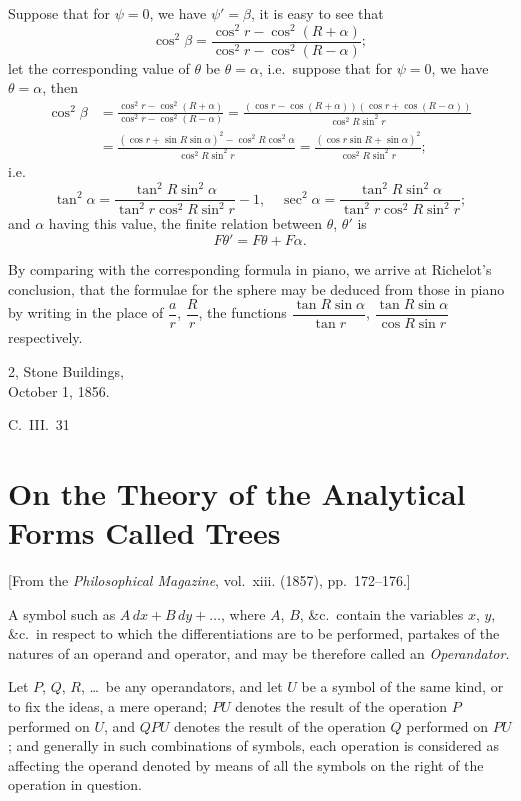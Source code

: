 \documentclass[11pt,a4paper]{book}
\begin{document}
Suppose that for $\psi = 0$, we have $\psi' = \beta$, it is easy to see that
\[
\cos^2\beta = \frac{\cos^2 r - \cos^2(R+\alpha)}{\cos^2 r - \cos^2(R-\alpha)};
\]
let the corresponding value of $\theta$ be $\theta = \alpha$, i.e.\ suppose that for $\psi = 0$, we have $\theta = \alpha$, then
\begin{align*}
\cos^2\beta &= \frac{\cos^2 r - \cos^2(R+\alpha)}{\cos^2 r - \cos^2(R-\alpha)} = \frac{(\cos r - \cos(R+\alpha))(\cos r + \cos(R-\alpha))}{\cos^2 R \sin^2 r} \\
&= \frac{(\cos r + \sin R \sin\alpha)^2 - \cos^2 R \cos^2\alpha}{\cos^2 R \sin^2 r} = \frac{(\cos r \sin R + \sin\alpha)^2}{\cos^2 R \sin^2 r};
\end{align*}
i.e.
\[
\tan^2\alpha = \frac{\tan^2 R \sin^2\alpha}{\tan^2 r \cos^2 R \sin^2 r} - 1, \quad \sec^2\alpha = \frac{\tan^2 R \sin^2\alpha}{\tan^2 r \cos^2 R \sin^2 r};
\]
and $\alpha$ having this value, the finite relation between $\theta$, $\theta'$ is
\[
F\theta' = F\theta + F\alpha.
\]

By comparing with the corresponding formula in piano, we arrive at Richelot's conclusion, that the formulae for the sphere may be deduced from those in piano by writing in the place of $\dfrac{a}{r}$, $\dfrac{R}{r}$, the functions $\dfrac{\tan R \sin\alpha}{\tan r}$, $\dfrac{\tan R \sin\alpha}{\cos R \sin r}$ respectively.

\begin{flushright}
2, Stone Buildings,\\
October 1, 1856.
\end{flushright}
\hfill C.~III.~31
\newpage


\section{On the Theory of the Analytical Forms Called Trees}
\label{sec:203}

[From the \textit{Philosophical Magazine}, vol.~xiii. (1857), pp.~172--176.]
\vspace{1em}

A symbol such as $A\,dx + B\,dy + \ldots$, where $A$, $B$, \&c.\ contain the variables $x$, $y$, \&c.\ in respect to which the differentiations are to be performed, partakes of the natures of an operand and operator, and may be therefore called an \textit{Operandator}.

Let $P$, $Q$, $R$, \ldots\ be any operandators, and let $U$ be a symbol of the same kind, or to fix the ideas, a mere operand; $PU$ denotes the result of the operation $P$ performed on $U$, and $QPU$ denotes the result of the operation $Q$ performed on $PU$; and generally in such combinations of symbols, each operation is considered as affecting the operand denoted by means of all the symbols on the right of the operation in question.
\end{document}

